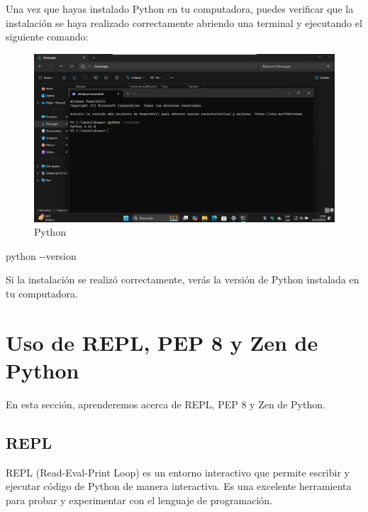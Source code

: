 \documentclass[
  a4paper,
  DIV=11,
  numbers=noendperiod,
  onepage,
  openany]{scrreprt}
\newenvironment{Shaded}{\begin{snugshade}}{\end{snugshade}}
\newcommand{\AttributeTok}[1]{\textcolor[rgb]{0.40,0.45,0.13}{#1}}
\newcommand{\ExtensionTok}[1]{\textcolor[rgb]{0.00,0.23,0.31}{#1}}
\begin{document}
Una vez que hayas instalado Python en tu computadora, puedes verificar
que la instalación se haya realizado correctamente abriendo una terminal
y ejecutando el siguiente comando:

\begin{figure}[H]

{\centering \includegraphics{unidades/unidad1/images/python_version.png}

}

\caption{Python}

\end{figure}%

\begin{Shaded}
\begin{Highlighting}[]
\ExtensionTok{python} \AttributeTok{{-}{-}version}
\end{Highlighting}
\end{Shaded}

Si la instalación se realizó correctamente, verás la versión de Python
instalada en tu computadora.

\section{Uso de REPL, PEP 8 y Zen de
Python}\label{uso-de-repl-pep-8-y-zen-de-python}

En esta sección, aprenderemos acerca de REPL, PEP 8 y Zen de Python.

\subsection{REPL}\label{repl}

REPL (Read-Eval-Print Loop) es un entorno interactivo que permite
escribir y ejecutar código de Python de manera interactiva. Es una
excelente herramienta para probar y experimentar con el lenguaje de
programación.
\end{document}
